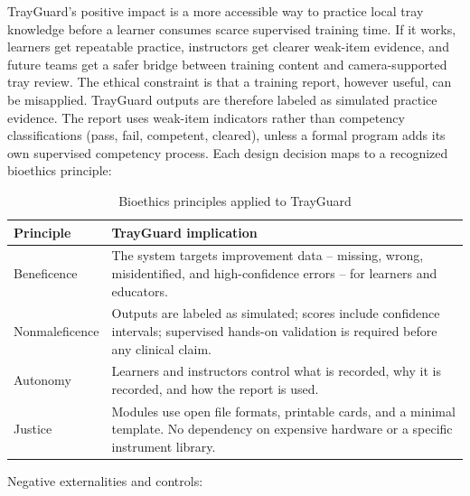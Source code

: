 \documentclass[10pt,a4paper]{article}
\begin{document}
TrayGuard's positive impact is a more accessible way to practice local tray
knowledge before a learner consumes scarce supervised training time. If it
works, learners get repeatable practice, instructors get clearer weak-item
evidence, and future teams get a safer bridge between training content and
camera-supported tray review.
The ethical constraint is that a training report, however useful, can be
misapplied. TrayGuard outputs are therefore labeled as simulated practice
evidence. The report uses weak-item indicators rather than competency
classifications (pass, fail, competent, cleared), unless a formal program adds
its own supervised competency process.
Each design decision maps to a recognized bioethics principle:
\begin{table}[H]
\centering
\caption{Bioethics principles applied to TrayGuard}
\label{tab:bioethics-principles-applied-to-trayguard}
\small\renewcommand{\arraystretch}{1.2}\setlength{\tabcolsep}{4pt}
\begin{tabularx}{\textwidth}{|>{\raggedright\arraybackslash}X|>{\raggedright\arraybackslash}X|}
\hline
Principle & TrayGuard implication \\
\hline
Beneficence & The system targets improvement data -- missing, wrong, misidentified, and high-confidence errors -- for learners and educators. \\
\hline
Nonmaleficence & Outputs are labeled as simulated; scores include confidence intervals; supervised hands-on validation is required before any clinical claim. \\
\hline
Autonomy & Learners and instructors control what is recorded, why it is recorded, and how the report is used. \\
\hline
Justice & Modules use open file formats, printable cards, and a minimal template. No dependency on expensive hardware or a specific instrument library. \\
\hline
\end{tabularx}
\end{table}
Negative externalities and controls:
\end{document}
